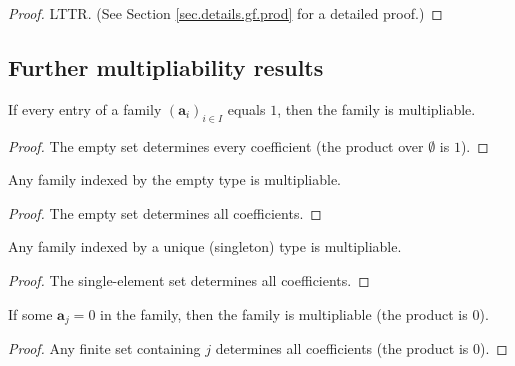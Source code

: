\begin{proof}
\leanok
LTTR. (See Section \ref{sec.details.gf.prod} for a detailed proof.)
\end{proof}

\subsection{Further multipliability results}

\begin{lemma}
\label{lem.fps.multipliable-const-one}
\leanhelper
\leanok
If every entry of a family
$\left(\mathbf{a}_{i}\right)_{i\in I}$ equals $1$, then the family is multipliable.
\end{lemma}

\begin{proof}
\leanok
The empty set determines every coefficient (the product over $\emptyset$ is $1$).
\end{proof}

\begin{lemma}
\label{lem.fps.multipliable-empty}
\leanhelper
\leanok
Any family indexed by the empty type is multipliable.
\end{lemma}

\begin{proof}
\leanok
The empty set determines all coefficients.
\end{proof}

\begin{lemma}
\label{lem.fps.multipliable-singleton}
\leanhelper
\leanok
Any family indexed by a unique (singleton) type is multipliable.
\end{lemma}

\begin{proof}
\leanok
The single-element set determines all coefficients.
\end{proof}

\begin{lemma}
\label{lem.fps.multipliable-of-zero-mem}
\leanhelper
\leanok
If some $\mathbf{a}_j = 0$ in the family, then the family is multipliable
(the product is $0$).
\end{lemma}

\begin{proof}
\leanok
Any finite set containing $j$ determines all coefficients (the product is $0$).
\end{proof}

